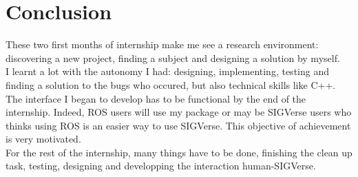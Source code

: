 \chapter{Conclusion}
\setlength{\parskip}{2.5ex plus .4ex minus .4ex}
These two first months of internship make me see a research environment: discovering a new project, finding a subject and designing a solution by myself.\\
I learnt a lot with the autonomy I had: designing, implementing, testing and finding a solution to the bugs who occured, but also technical skills like C++.\\

The interface I began to develop has to be functional by the end of the internship. Indeed, ROS users will use my package or may be SIGVerse users who thinks using ROS is an easier way to use SIGVerse. This objective of achievement is very motivated.\\

For the rest of the internship, many things have to be done, finishing the clean up task, testing, designing and developping the interaction human-SIGVerse.

%
